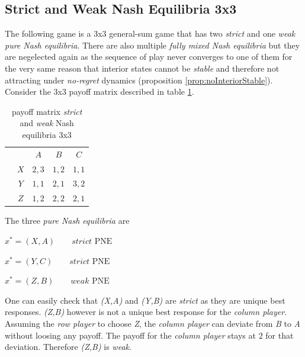 \subsection{Strict and Weak Nash Equilibria 3x3}\label{subsection:3x3}

The following game is a 3x3 general-sum game that has two \textit{strict} and one \textit{weak pure Nash equilibria}. There are also multiple \textit{fully mixed Nash equilibria} but they are negelected again as the sequence of play never converges to one of them for the very same reason that interior states cannot be \textit{stable} and therefore not attracting under \textit{no-regret} dynamics (proposition \ref{prop:noInteriorStable}). Consider the 3x3 payoff matrix described in table \ref{tab:payoffStrictAndWeak3x3}. 

\begin{table}[H]\centering
\setlength{\extrarowheight}{2pt}
\begin{tabular}{cc|c|c|c|}
  & \multicolumn{1}{c}{} & \multicolumn{1}{c}{$A$}  & \multicolumn{1}{c}{$B$}  & \multicolumn{1}{c}{$C$} \\\cline{3-5}
            & $X$ & $2,3$ & $1,2$ & $1,1$ \\ \cline{3-5}
            & $Y$ & $1,1$ & $2,1$ & $3,2$ \\\cline{3-5}
            & $Z$ & $1,2$ & $2,2$ & $2,1$ \\\cline{3-5}
\end{tabular}\caption{\label{tab:payoffStrictAndWeak3x3}payoff matrix \textit{strict} and \textit{weak} Nash equilibria 3x3}
\end{table}

The three \textit{pure Nash equilibria} are

\begin{description}\centering
    \item $x^{*} = (X,A) \qquad \textit{strict }\text{PNE}$
    \item $x^{*} = (Y,C) \qquad \textit{strict }\text{PNE}$
    \item $x^{*} = (Z,B) \qquad \textit{weak }\text{PNE}$
\end{description}

One can easily check that \textit{(X,A)} and \textit{(Y,B)} are \textit{strict} as they are unique best responses. \textit{(Z,B)} however is not a unique best response for the \textit{column player}. Assuming the \textit{row player} to choose \textit{Z}, the \textit{column player} can deviate from \textit{B} to \textit{A} without loosing any payoff. The payoff for the \textit{column player} stays at $2$ for that deviation. Therefore \textit{(Z,B)} is \textit{weak}. \\

